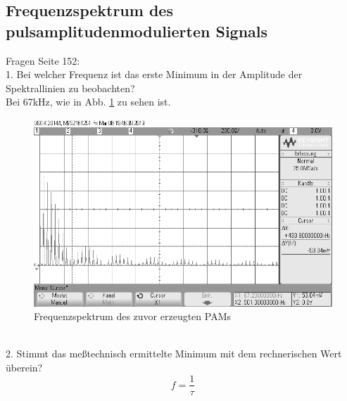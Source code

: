 \documentclass[12pt,a4paper]{scrartcl}
\begin{document}
    
    \subsection{Frequenzspektrum des pulsamplitudenmodulierten Signals}
        \label{sub-sec-frequenz-pulsamplitudenmoduliertes-signal}
        Fragen Seite 152:\\
         1. Bei welcher Frequenz ist das erste Minimum in der Amplitude der Spektrallinien zu beobachten?\\
          Bei 67kHz, wie in Abb. \ref{fig:scope_6} zu sehen ist.\\
           \begin{figure}[htbp]
    \begin{minipage}{1\textwidth}
         \centering
         \includegraphics[width=1\textwidth]{scope_6}
         \caption{Frequenzspektrum des zuvor erzeugten PAMs}
   
          \label{fig:scope_6}
    \end{minipage}
    \end{figure}\\
    
          2. Stimmt das meßtechnisch ermittelte Minimum mit dem rechnerischen Wert überein?\\
          \begin{equation*}
f=\frac{1}{\tau}		    
	\end{equation*}
       
\end{document}
